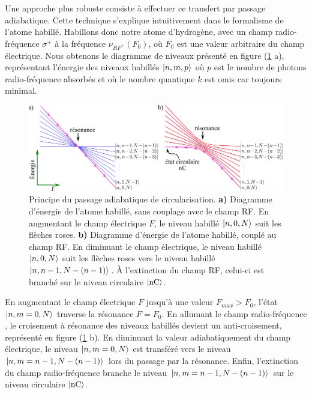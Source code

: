 Une approche plus robuste consiste à effectuer ce transfert par passage adiabatique.
Cette technique s'explique intuitivement dans le formalisme de l'atome habillé.
Habillons donc notre atome d'hydrogène, avec un champ radio-fréquence $\sigma^+$ à la fréquence $\nu_{RF^+}(F_0)$, où $F_0$ est une valeur arbitraire du champ électrique.
Nous obtenons le diagramme de niveaux présenté en figure (\ref{fig:passage_adiab_hydrogen} a), représentant l'énergie des niveaux habillés $\ket{n,m,p}$ où $p$ est le nombre de photons radio-fréquence absorbés et où le nombre quantique $k$ est omis car toujours minimal.
%
\begin{figure}[h]
\centering
\includegraphics[width=\linewidth]{figures/circulars/passage_adiab_hydrogen}
\caption[Principe du passage adiabatique de circularisation]{
Principe du passage adiabatique de circularisation.
\textbf{a)} Diagramme d'énergie de l'atome habillé, sans couplage avec le champ RF.
En augmentant le champ électrique $F$, le niveau habillé $\ket{n,0,N}$ suit les flèches roses.
\textbf{b)} Diagramme d'énergie de l'atome habillé, couplé au champ RF.
En diminuant le champ électrique, le niveau habillé $\ket{n,0,N}$ suit les flèches roses vers le niveau habillé $\ket{n,n-1,N-(n-1)}$. \`A l'extinction du champ RF, celui-ci est branché sur le niveau circulaire $\ket{\mathrm{nC}}$.
}
\label{fig:passage_adiab_hydrogen}
\end{figure} 
%
En augmentant le champ électrique $F$ jusqu'à une valeur $F_{max}>F_0$, l'état $\ket{n,m=0,N}$ traverse la résonance $F=F_0$.
En allumant le champ radio-fréquence%
, le croisement à résonance des niveaux habillés devient un anti-croisement, représenté en figure (\ref{fig:passage_adiab_hydrogen} b).
En diminuant la valeur adiabatiquement du champ électrique, le niveau $\ket{n,m=0,N}$ est transféré vers le niveau $\ket{n,m=n-1,N-(n-1)}$ lors du passage par la résonance.
Enfin, l'extinction du champ radio-fréquence branche le niveau $\ket{n,m=n-1,N-(n-1)}$ sur le niveau circulaire $\ket{\mathrm{nC}}$.


